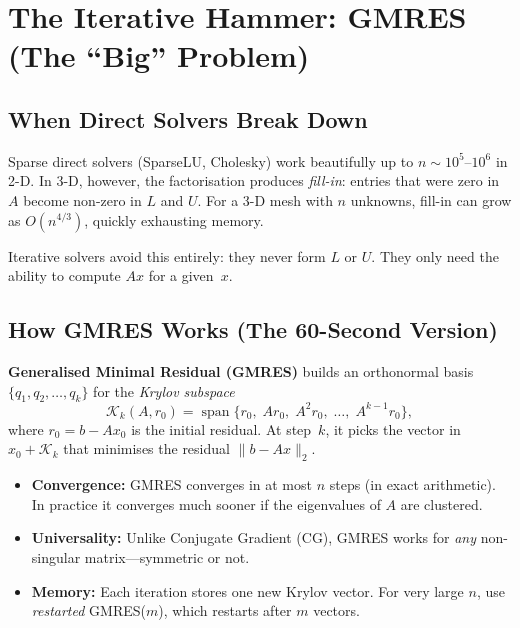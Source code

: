 \section{The Iterative Hammer: GMRES (The ``Big'' Problem)}
\label{sec:gmres}

\subsection{When Direct Solvers Break Down}

Sparse direct solvers (SparseLU, Cholesky) work beautifully up to
$n \sim 10^5$--$10^6$ in 2-D.  In 3-D, however, the factorisation
produces \emph{fill-in}: entries that were zero in $A$ become non-zero
in $L$ and $U$.  For a 3-D mesh with $n$ unknowns, fill-in can grow
as $O(n^{4/3})$, quickly exhausting memory.

Iterative solvers avoid this entirely: they never form $L$ or $U$.
They only need the ability to compute $Ax$ for a given~$x$.

\subsection{How GMRES Works (The 60-Second Version)}

\textbf{Generalised Minimal Residual (GMRES)} builds an orthonormal
basis $\{q_1, q_2, \dots, q_k\}$ for the \emph{Krylov subspace}
\[
    \mathcal{K}_k(A, r_0) = \operatorname{span}\{r_0,\; Ar_0,\;
    A^2 r_0,\; \dots,\; A^{k-1} r_0\},
\]
where $r_0 = b - Ax_0$ is the initial residual.  At step~$k$, it
picks the vector in $x_0 + \mathcal{K}_k$ that minimises the
residual $\|b - Ax\|_2$.

\begin{itemize}[nosep]
    \item \textbf{Convergence:} GMRES converges in at most $n$ steps
          (in exact arithmetic).  In practice it converges much
          sooner if the eigenvalues of $A$ are clustered.
    \item \textbf{Universality:} Unlike Conjugate Gradient (CG),
          GMRES works for \emph{any} non-singular matrix---symmetric
          or not.
    \item \textbf{Memory:} Each iteration stores one new Krylov vector.
          For very large $n$, use \emph{restarted} GMRES($m$),
          which restarts after $m$ vectors.
\end{itemize}

